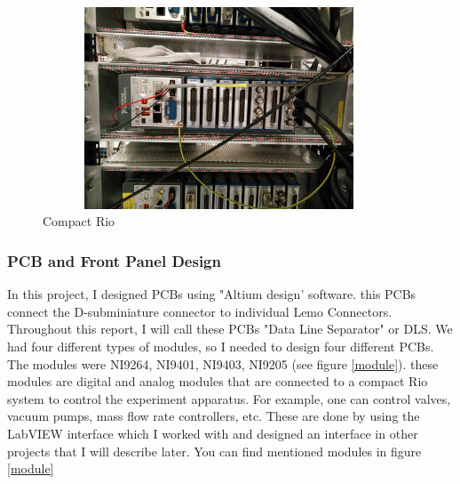 \documentclass[12pt,a4paper]{article}
\begin{document}
\begin{figure}[h]
\centering
\includegraphics[width=105mm, height=60mm]{crio}
\caption{Compact Rio}
\label{crio}
\end{figure}

\subsubsection{PCB and Front Panel Design}
In this project, I designed PCBs using "Altium design' software. this PCBs connect the D-subminiature connector to individual Lemo Connectors. Throughout this report, I will call these PCBs "Data Line Separator" or DLS. We had four different types of modules, so I needed to design four different PCBs.
The modules were NI9264, NI9401, NI9403, NI9205 (see figure \ref{module}). these modules are digital and analog modules that are connected to a compact Rio system to control the experiment apparatus. For example, one can control valves, vacuum pumps, mass flow rate controllers, etc. These are done by using the LabVIEW interface which I worked with and designed an interface in other projects that  I will describe later. You can find mentioned modules in figure \ref{module}
\end{document}
